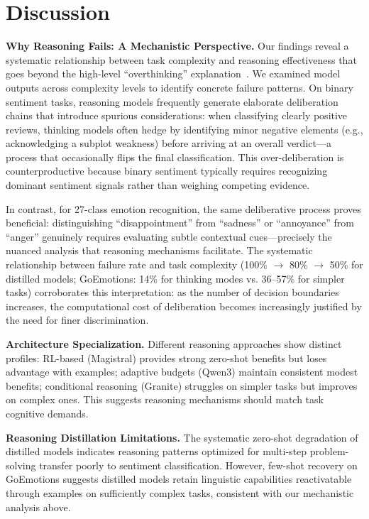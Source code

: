 \documentclass[runningheads]{llncs}
\begin{document}
\section{Discussion}

\textbf{Why Reasoning Fails: A Mechanistic Perspective.} Our findings reveal a systematic relationship between task complexity and reasoning effectiveness that goes beyond the high-level ``overthinking'' explanation~\cite{li2025financial}. We examined model outputs across complexity levels to identify concrete failure patterns. On binary sentiment tasks, reasoning models frequently generate elaborate deliberation chains that introduce spurious considerations: when classifying clearly positive reviews, thinking models often hedge by identifying minor negative elements (e.g., acknowledging a subplot weakness) before arriving at an overall verdict---a process that occasionally flips the final classification. This over-deliberation is counterproductive because binary sentiment typically requires recognizing dominant sentiment signals rather than weighing competing evidence.

In contrast, for 27-class emotion recognition, the same deliberative process proves beneficial: distinguishing ``disappointment'' from ``sadness'' or ``annoyance'' from ``anger'' genuinely requires evaluating subtle contextual cues---precisely the nuanced analysis that reasoning mechanisms facilitate. The systematic relationship between failure rate and task complexity (100\% $\rightarrow$ 80\% $\rightarrow$ 50\% for distilled models; GoEmotions: 14\% for thinking modes vs. 36--57\% for simpler tasks) corroborates this interpretation: as the number of decision boundaries increases, the computational cost of deliberation becomes increasingly justified by the need for finer discrimination.

\textbf{Architecture Specialization.} Different reasoning approaches show distinct profiles: RL-based (Magistral) provides strong zero-shot benefits but loses advantage with examples; adaptive budgets (Qwen3) maintain consistent modest benefits; conditional reasoning (Granite) struggles on simpler tasks but improves on complex ones. This suggests reasoning mechanisms should match task cognitive demands.

\textbf{Reasoning Distillation Limitations.} The systematic zero-shot degradation of distilled models indicates reasoning patterns optimized for multi-step problem-solving transfer poorly to sentiment classification. However, few-shot recovery on GoEmotions suggests distilled models retain linguistic capabilities reactivatable through examples on sufficiently complex tasks, consistent with our mechanistic analysis above.
\end{document}
